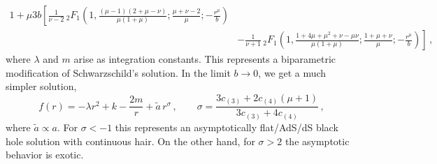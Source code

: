 \documentclass[11pt]{article}
\begin{document}
{\begin{equation}
\begin{aligned}
{{{   }{1+\mu }}}{3 b} \left[\frac{1}{\nu-2} \, _2F_1\left(1,\frac{(\mu-1) (2+\mu -\nu )}{\mu  (1+\mu
   )};\frac{\mu +\nu-2 }{\mu };-\frac{r^{\mu }}{b}\right)\right.\\
   &\left.-\frac{1}{\nu+1} \,
   _2F_1\left(1,\frac{1+4 \mu +\mu ^2+\nu -\mu  \nu }{\mu( 1+\mu )};\frac{1+\mu +\nu
   }{\mu };-\frac{r^{\mu }}{b}\right)\right]\, ,
\end{aligned}
\end{equation}
where $\lambda$ and $m$ arise as integration constants. This represents a biparametric modification of Schwarzschild's solution. In the limit $b\rightarrow 0$, we get a much simpler solution,
\begin{equation}
f(r)=-\lambda r^2+k-\frac{2m}{r}+\tilde a \, r^{\sigma}\, ,\qquad \sigma=\frac{3 c_{(3)}+2c_{(4)} \left(\mu+1\right)}{3 c_{(3)}+4 c_{(4)}}\, ,
\end{equation}
where $\tilde a\propto a$.  For $\sigma<-1$ this represents an asymptotically flat/AdS/dS black hole solution with continuous hair. On the other hand, for $\sigma>2$ the asymptotic behavior is exotic. 

}
\end{document}
